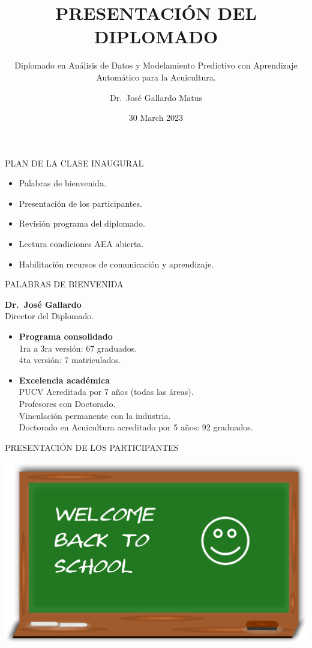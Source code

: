 \documentclass[
  ignorenonframetext,
]{beamer}
\title{PRESENTACIÓN DEL DIPLOMADO}
\subtitle{Diplomado en Análisis de Datos y Modelamiento Predictivo con Aprendizaje
Automático para la Acuicultura.}
\author{Dr.~José Gallardo Matus}
\date{30 March 2023}
\institute{Pontificia Universidad Católica de Valparaíso}
\begin{document}
\frame{\titlepage}

\begin{frame}{PLAN DE LA CLASE INAUGURAL}
\protect\hypertarget{plan-de-la-clase-inaugural}{}

\begin{itemize}
\item
  Palabras de bienvenida.
\item
  Presentación de los participantes.
\item
  Revisión programa del diplomado.
\item
  Lectura condiciones AEA abierta.
\item
  Habilitación recursos de comunicación y aprendizaje.
\end{itemize}

\end{frame}

\begin{frame}{PALABRAS DE BIENVENIDA}
\protect\hypertarget{palabras-de-bienvenida}{}

\textbf{Dr.~José Gallardo}\\
Director del Diplomado.

\begin{itemize}
\item
  \textbf{Programa consolidado}\\
  1ra a 3ra versión: 67 graduados.\\
  4ta versión: 7 matriculados.
\item
  \textbf{Excelencia académica}\\
  PUCV Acreditada por 7 años (todas las áreas).\\
  Profesores con Doctorado.\\
  Vinculación permanente con la industria.\\
  Doctorado en Acuicultura acreditado por 5 años: 92 graduados.
\end{itemize}

\end{frame}

\begin{frame}{PRESENTACIÓN DE LOS PARTICIPANTES}
\protect\hypertarget{presentaciuxf3n-de-los-participantes}{}

\includegraphics[width=1\linewidth]{Welcome}

\end{frame}
\end{document}
